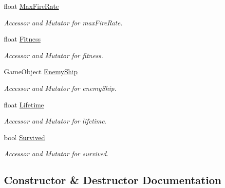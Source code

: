 \begin{DoxyCompactItemize}
float \mbox{\hyperlink{class_individual_ae94ddacbf2764ce8b1fb2fde1bc2d72c}{Max\+Fire\+Rate}}
\begin{DoxyCompactList}\small\item\em Accessor and Mutator for max\+Fire\+Rate. \end{DoxyCompactList}\item 
float \mbox{\hyperlink{class_individual_a5a4701f9a402fe64b8e3c24368e52101}{Fitness}}
\begin{DoxyCompactList}\small\item\em Accessor and Mutator for fitness. \end{DoxyCompactList}\item 
Game\+Object \mbox{\hyperlink{class_individual_a473dd92ebe3c07db394d6bcd0bfcac93}{Enemy\+Ship}}
\begin{DoxyCompactList}\small\item\em Accessor and Mutator for enemy\+Ship. \end{DoxyCompactList}\item 
float \mbox{\hyperlink{class_individual_ac7551473ef8d053170dba6810aa69187}{Lifetime}}
\begin{DoxyCompactList}\small\item\em Accessor and Mutator for lifetime. \end{DoxyCompactList}\item 
bool \mbox{\hyperlink{class_individual_ad4b03453693cb1ab8185c6a4335e86bd}{Survived}}
\begin{DoxyCompactList}\small\item\em Accessor and Mutator for survived. \end{DoxyCompactList}\end{DoxyCompactItemize}


\subsection{Constructor \& Destructor Documentation}
\mbox{\label{class_individual_ae542e9759275736feb0c5f065d36bfd8}} 
